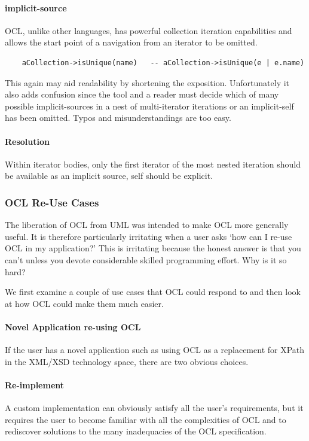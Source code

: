 \documentclass{jot}
\begin{document}
\paragraph{implicit-source} OCL, unlike other languages, has powerful collection iteration capabilities and allows the start point of a navigation from an iterator to be omitted.

\begin{verbatim}
    aCollection->isUnique(name)   -- aCollection->isUnique(e | e.name)
\end{verbatim}

This again may aid readability by shortening the exposition. Unfortunately it also adds confusion since the tool and a reader must decide which of many possible implicit-sources in a nest of multi-iterator iterations or an implicit-self has been omitted. Typos and misunderstandings are too easy.

\paragraph{Resolution}

Within iterator bodies, only the first iterator of the most nested iteration should be available as an implicit source, self should be explicit.

\subsubsection{OCL Re-Use Cases}

The liberation of OCL from UML was intended to make OCL more generally useful. It is therefore particularly irritating when a user asks `how can I re-use OCL in my application?' This is irritating because the honest answer is that you can't unless you devote considerable skilled programming effort. Why is it so hard?

We first examine a couple of use cases that OCL could respond to and then look at how OCL could make them much easier.

\paragraph{Novel Application re-using OCL}

If the user has a novel application such as using OCL as a replacement for XPath in the XML/XSD technology space, there are two obvious choices.

\paragraph{Re-implement} A custom implementation can obviously satisfy all the user's requirements, but it requires the user to become familiar with all the complexities of OCL and to rediscover solutions to the many inadequacies of the OCL specification.
\end{document}
